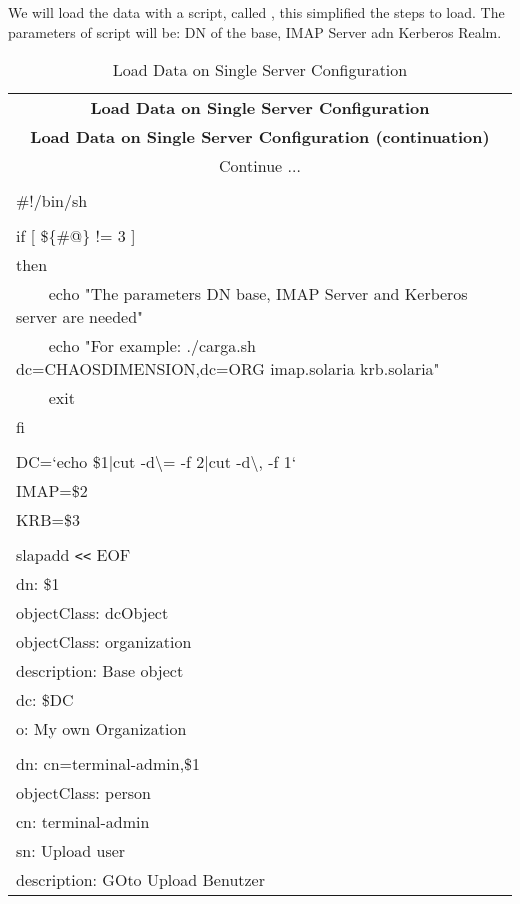 We will load the data with a script, called , this simplified the steps to load. The parameters of script will be: DN of the base, IMAP Server adn Kerberos Realm.
\begin{center}
\begin{longtable}{|l|}\hline
\caption{Load Data on Single Server Configuration}\\
\hline \hline
\multicolumn{1}{|c|}{\textbf{Load Data on Single Server Configuration}}\\
\hline \hline
\endfirsthead
\hline \hline
\multicolumn{1}{|c|}{\textbf{Load Data on Single Server Configuration (continuation)}}\\
\hline \hline
\endhead
\hline
\multicolumn{1}{|c|}{Continue $\ldots$}\\
\hline
\endfoot
\hline
\multicolumn{1}{|c|}{\textbf{End}}\\
\hline
\endlastfoot
\#!/bin/sh\\
\\
if [ \$\{\#@\} != 3 ]\\
then\\
\verb|    |echo "The parameters DN base, IMAP Server and Kerberos server are needed"\\
\verb|    |echo "For example: ./carga.sh dc=CHAOSDIMENSION,dc=ORG imap.solaria krb.solaria"\\
\verb|    |exit\\
fi\\
\\
DC=`echo \$1|cut -d\textbackslash= -f 2|cut -d\textbackslash, -f 1`\\
IMAP=\$2\\
KRB=\$3\\
\\
slapadd \verb|<<| EOF\\
dn: \$1\\
objectClass: dcObject\\
objectClass: organization\\
description: Base object\\
dc: \$DC\\
o: My own Organization\\
\\
dn: cn=terminal-admin,\$1\\
objectClass: person\\
cn: terminal-admin\\
sn: Upload user\\
description: GOto Upload Benutzer\\

\end{longtable}
\end{center}
